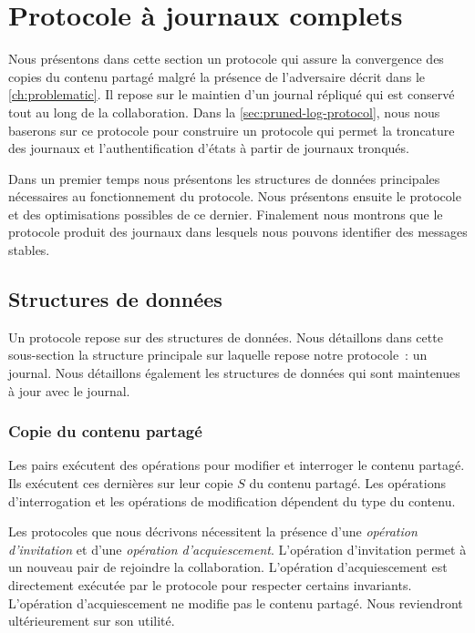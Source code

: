 \section{Protocole à journaux complets}\label{sec:full-log-protocol}

Nous présentons dans cette section un protocole qui assure la convergence des copies du contenu partagé malgré la présence de l'adversaire décrit dans le \autoref{ch:problematic}.
Il repose sur le maintien d'un journal répliqué qui est conservé tout au long de la collaboration.
Dans la \autoref{sec:pruned-log-protocol}, nous nous baserons sur ce protocole pour construire un protocole qui permet la troncature des journaux et l'authentification d'états à partir de journaux tronqués.

Dans un premier temps nous présentons les structures de données principales nécessaires au fonctionnement du protocole.
Nous présentons ensuite le protocole et des optimisations possibles de ce dernier.
Finalement nous montrons que le protocole produit des journaux dans lesquels nous pouvons identifier des messages stables.


\subsection{Structures de données}\label{subsec:full-log-data-structures}

Un protocole repose sur des structures de données.
Nous détaillons dans cette sous-section la structure principale sur laquelle repose notre protocole~: un journal.
Nous détaillons également les structures de données qui sont maintenues à jour avec le journal.

\subsubsection{Copie du contenu partagé}

Les pairs exécutent des opérations pour modifier et interroger le contenu partagé.
Ils exécutent ces dernières sur leur copie $S$ du contenu partagé.
Les opérations d'interrogation et les opérations de modification dépendent du type du contenu.

Les protocoles que nous décrivons nécessitent la présence d'une \emph{opération d'invitation} et d'une \emph{opération d'acquiescement}.
L'opération d'invitation permet à un nouveau pair de rejoindre la collaboration.
L'opération d'acquiescement est directement exécutée par le protocole pour respecter certains invariants.
L'opération d'acquiescement ne modifie pas le contenu partagé.
Nous reviendront ultérieurement sur son utilité.

